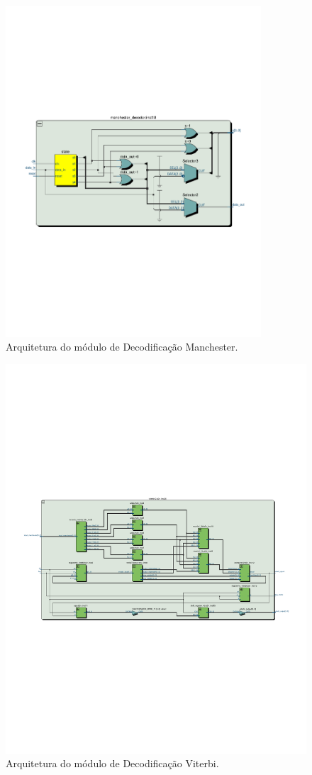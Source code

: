 \begin{figure}[h]
	\caption{\label{figure:manchester-decoder-rtl}Arquitetura do módulo de Decodificação Manchester.}
	\centering
	\includegraphics[width=0.85\textwidth, trim={0 7.7cm 0 8.5cm}, clip]{manchester/decoder-rtl.pdf}
\end{figure}

\begin{figure}[h]
	\caption{\label{figure:viterbi-rtl}Arquitetura do módulo de Decodificação Viterbi.}
	\centering
	\includegraphics[width=1\textwidth, trim={0 7.7cm 0 8.5cm}, clip]{viterbi/rtl.pdf}
\end{figure}
